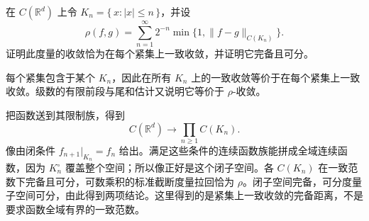 \begin{exercise}\label{b1:ex:A1-local-functions}
在 \(C(\mathbb R^d)\) 上令 \(K_n=\{\,x:|x|\le n\,\}\)，并设
\[
 \rho(f,g)=\sum_{n=1}^{\infty}2^{-n}\min\{1,\|f-g\|_{C(K_n)}\}.
\]
证明此度量的收敛恰为在每个紧集上一致收敛，并证明它完备且可分。
\end{exercise}
\begin{solution}
每个紧集包含于某个 \(K_n\)，因此在所有 \(K_n\) 上的一致收敛等价于在每个紧集上一致收敛。级数的有限前段与尾和估计又说明它等价于 \(\rho\)-收敛。

把函数送到其限制族，得到
\[
 C(\mathbb R^d)\longrightarrow\prod_{n\ge1}C(K_n).
\]
像由闭条件 \(f_{n+1}|_{K_n}=f_n\) 给出。满足这些条件的连续函数族能拼成全域连续函数，因为 \(K_n^\circ\) 覆盖整个空间；所以像正好是这个闭子空间。各 \(C(K_n)\) 在一致范数下完备且可分，可数乘积的标准截断度量拉回恰为 \(\rho\)。闭子空间完备，可分度量子空间可分，由此得到两项结论。这里得到的是紧集上一致收敛的完备距离，不是要求函数全域有界的一致范数。
\end{solution}
